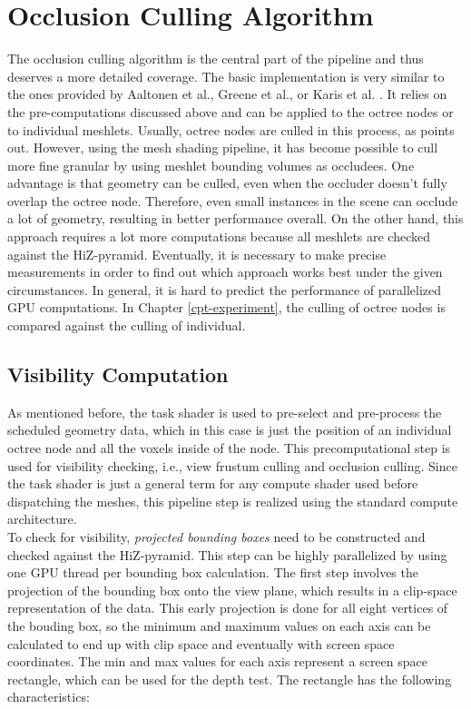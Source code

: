 \section{Occlusion Culling Algorithm} \label{sec-occlusion}

The occlusion culling algorithm is the central part of the pipeline and thus deserves a more detailed coverage. The 
basic implementation is very similar to the ones provided by Aaltonen et al., Greene et al., or Karis et al. 
\cite{Aaltonen2015,Greene93,Karis2021}. It relies on the pre-computations discussed above and can be applied to the 
octree nodes or to individual meshlets. Usually, octree nodes are culled in this process, as \cite{AkenineMoeller2018}
points out. However, using the mesh shading pipeline, it has become possible to cull more fine granular by using 
meshlet bounding volumes as occludees. One advantage is that geometry can be culled, even when the occluder doesn't 
fully overlap the octree node. Therefore, even small instances in the scene can occlude a lot of geometry, resulting 
in better performance overall. On the other hand, this approach requires a lot more computations because all meshlets 
are checked against the \ac{HiZ}-pyramid. Eventually, it is necessary to make precise measurements in order to find out 
which approach works best under the given circumstances. In general, it is hard to predict the performance of 
parallelized \ac{GPU} computations. In Chapter \ref{cpt-experiment}, the culling of octree nodes is compared against the 
culling of individual.


\subsection*{Visibility Computation} \label{subsec-visibility-computation}

As mentioned before, the task shader is used to pre-select and pre-process the scheduled geometry data, 
which in this case is just the position of an individual octree node and all the voxels inside of the node. 
This precomputational step is used for visibility checking, i.e., view frustum culling and occlusion culling. 
Since the task shader is just a general term for any compute shader used before dispatching the meshes, 
this pipeline step is realized using the standard compute architecture. \\

To check for visibility, \emph{projected bounding boxes} need to be constructed and checked against the 
\ac{HiZ}-pyramid. This step can be highly parallelized by using one \ac{GPU} thread per bounding box 
calculation. The first step involves the projection of the bounding box onto the view plane, which results 
in a clip-space representation of the data. This early projection is done for all eight vertices of the 
bouding box, so the minimum and maximum values on each axis can be calculated to end up with clip space 
and eventually with screen space coordinates. The min and max values for each axis represent a screen 
space rectangle, which can be used for the depth test. The rectangle has the following characteristics:

